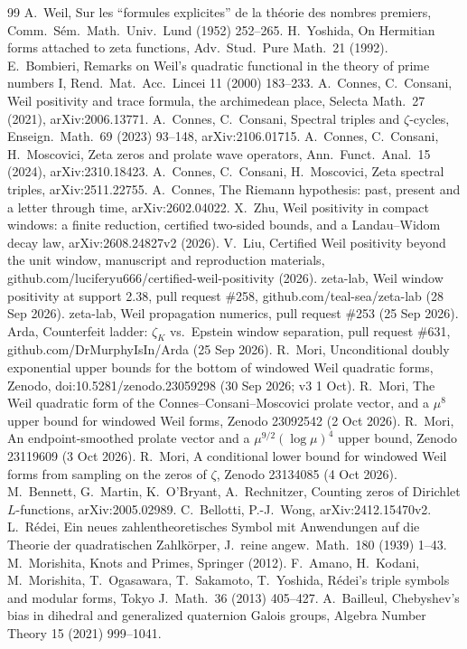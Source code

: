 \documentclass[11pt]{article}
\theoremstyle{remark}
\begin{document}
\begin{thebibliography}{99}
 A.~Weil, Sur les ``formules explicites'' de la théorie des nombres premiers, Comm.\ Sém.\ Math.\ Univ.\ Lund (1952) 252--265.
 H.~Yoshida, On Hermitian forms attached to zeta functions, Adv.\ Stud.\ Pure Math.\ 21 (1992).
 E.~Bombieri, Remarks on Weil's quadratic functional in the theory of prime numbers I, Rend.\ Mat.\ Acc.\ Lincei 11 (2000) 183--233.
 A.~Connes, C.~Consani, Weil positivity and trace formula, the archimedean place, Selecta Math.\ 27 (2021), arXiv:2006.13771.
 A.~Connes, C.~Consani, Spectral triples and $\zeta$-cycles, Enseign.\ Math.\ 69 (2023) 93--148, arXiv:2106.01715.
 A.~Connes, C.~Consani, H.~Moscovici, Zeta zeros and prolate wave operators, Ann.\ Funct.\ Anal.\ 15 (2024), arXiv:2310.18423.
 A.~Connes, C.~Consani, H.~Moscovici, Zeta spectral triples, arXiv:2511.22755.
 A.~Connes, The Riemann hypothesis: past, present and a letter through time, arXiv:2602.04022.
 X.~Zhu, Weil positivity in compact windows: a finite reduction, certified two-sided bounds, and a Landau--Widom decay law, arXiv:2608.24827v2 (2026).
 V.~Liu, Certified Weil positivity beyond the unit window, manuscript and reproduction materials, github.com/luciferyu666/certified-weil-positivity (2026).
 zeta-lab, Weil window positivity at support 2.38, pull request \#258, github.com/teal-sea/zeta-lab (28 Sep 2026).
 zeta-lab, Weil propagation numerics, pull request \#253 (25 Sep 2026).
 Arda, Counterfeit ladder: $\zeta_K$ vs.\ Epstein window separation, pull request \#631, github.com/DrMurphyIsIn/Arda (25 Sep 2026).
 R.~Mori, Unconditional doubly exponential upper bounds for the bottom of windowed Weil quadratic forms, Zenodo, doi:10.5281/zenodo.23059298 (30 Sep 2026; v3 1 Oct).
 R.~Mori, The Weil quadratic form of the Connes--Consani--Moscovici prolate vector, and a $\mu^8$ upper bound for windowed Weil forms, Zenodo 23092542 (2 Oct 2026).
 R.~Mori, An endpoint-smoothed prolate vector and a $\mu^{9/2}(\log\mu)^4$ upper bound, Zenodo 23119609 (3 Oct 2026).
 R.~Mori, A conditional lower bound for windowed Weil forms from sampling on the zeros of $\zeta$, Zenodo 23134085 (4 Oct 2026).
 M.~Bennett, G.~Martin, K.~O'Bryant, A.~Rechnitzer, Counting zeros of Dirichlet $L$-functions, arXiv:2005.02989.
 C.~Bellotti, P.-J.~Wong, arXiv:2412.15470v2.
 L.~Rédei, Ein neues zahlentheoretisches Symbol mit Anwendungen auf die Theorie der quadratischen Zahlkörper, J.\ reine angew.\ Math.\ 180 (1939) 1--43.
 M.~Morishita, Knots and Primes, Springer (2012).
 F.~Amano, H.~Kodani, M.~Morishita, T.~Ogasawara, T.~Sakamoto, T.~Yoshida, Rédei's triple symbols and modular forms, Tokyo J.\ Math.\ 36 (2013) 405--427.
 A.~Bailleul, Chebyshev's bias in dihedral and generalized quaternion Galois groups, Algebra Number Theory 15 (2021) 999--1041.
\end{thebibliography}
\end{document}
